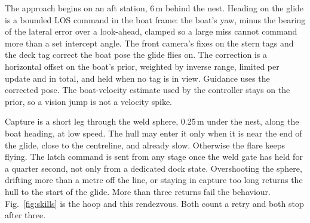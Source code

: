 \documentclass[conference]{IEEEtran}
\begin{document}
The approach begins on an aft station, 6\,m behind the nest. Heading on the glide is a bounded LOS command in the boat frame: the boat's yaw, minus the bearing of the lateral error over a look-ahead, clamped so a large miss cannot command more than a set intercept angle. The front camera's fixes on the stern tags and the deck tag correct the boat pose the glide flies on. The correction is a horizontal offset on the boat's prior, weighted by inverse range, limited per update and in total, and held when no tag is in view. Guidance uses the corrected pose. The boat-velocity estimate used by the controller stays on the prior, so a vision jump is not a velocity spike.

Capture is a short leg through the weld sphere, 0.25\,m under the nest, along the boat heading, at low speed. The hull may enter it only when it is near the end of the glide, close to the centreline, and already slow. Otherwise the flare keeps flying. The latch command is sent from any stage once the weld gate has held for a quarter second, not only from a dedicated dock state. Overshooting the sphere, drifting more than a metre off the line, or staying in capture too long returns the hull to the start of the glide. More than three returns fail the behaviour. Fig.~\ref{fig:skills} is the hoop and this rendezvous. Both count a retry and both stop after three.
\end{document}
